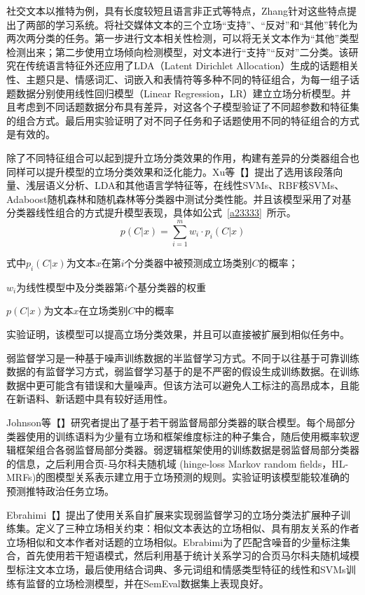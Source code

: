 社交文本以推特为例，具有长度较短且语言非正式等特点，Zhang针对这些特点提出了两部的学习系统。将社交媒体文本的三个立场“支持”、“反对”和“其他”转化为两次两分类的任务。第一步进行文本相关性检测，可以将无关文本作为“其他”类型检测出来；第二步使用立场倾向检测模型，对文本进行“支持”“反对”二分类。该研究在传统语言特征外还应用了LDA（Latent Dirichlet Allocation）生成的话题相关性、主题只是、情感词汇、词嵌入和表情符等多种不同的特征组合，为每一组子话题数据分别使用线性回归模型（Linear Regression，LR）建立立场分析模型。并且考虑到不同话题数据分布具有差异，对这各个子模型验证了不同超参数和特征集的组合方式。最后用实验证明了对不同子任务和子话题使用不同的特征组合的方式是有效的。

除了不同特征组合可以起到提升立场分类效果的作用，构建有差异的分类器组合也同样可以提升模型的立场分类效果和泛化能力。Xu等【】提出了选用该段落向量、浅层语义分析、LDA和其他语言学特征等，在线性SVMs、RBF核SVMs、Adaboost随机森林和随机森林等分类器中测试分类性能。并且该模型采用了对基分类器线性组合的方式提升模型表现，具体如公式~\ref{a23333}~所示。
\begin{equation}\label{a23333}
p(C|x)=\sum_{i=1}^m w_i \cdot p_i(C|x)
\end{equation}

式中$p_i(C|x)$为文本$x$在第$i$个分类器中被预测成立场类别$C$的概率；

$w_i$为线性模型中及分类器第$i$个基分类器的权重

$p(C|x)$为文本$x$在立场类别$C$中的概率

实验证明，该模型可以提高立场分类效果，并且可以直接被扩展到相似任务中。


弱监督学习是一种基于噪声训练数据的半监督学习方式。不同于以往基于可靠训练数据的有监督学习方式，弱监督学习基于的是不严密的假设生成训练数据。在训练数据中更可能含有错误和大量噪声。但该方法可以避免人工标注的高昂成本，且能在新语料、新话题中具有较好适用性。

Johnson等【】研究者提出了基于若干弱监督局部分类器的联合模型。每个局部分类器使用的训练语料为少量有立场和框架维度标注的种子集合，随后使用概率软逻辑框架组合各弱监督局部分类器。弱逻辑框架使用的训练数据是弱监督局部分类器的信息，之后利用合页-马尔科夫随机域 (hinge-loss Markov random fields，HL- MRFs)的图模型关系表示建立用于立场预测的规则。实验证明该模型能较准确的预测推特政治任务立场。

Ebrahimi【】提出了使用关系自扩展来实现弱监督学习的立场分类法扩展种子训练集。定义了三种立场相关约束：相似文本表达的立场相似、具有朋友关系的作者立场相似和文本作者对话题的立场相似。Ebrabimi为了匹配含噪音的少量标注集合，首先使用若干短语模式，然后利用基于统计关系学习的合页马尔科夫随机域模型标注文本立场，最后使用结合词典、多元词组和情感类型特征的线性和SVMs训练有监督的立场检测模型，并在SemEval数据集上表现良好。

